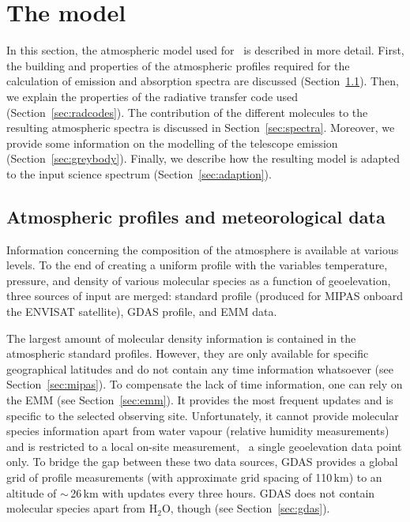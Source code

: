 \section{The model}\label{sec:model}
In this section, the atmospheric model used for \mf\ is described in
more detail. First, the building and properties of the atmospheric profiles
required for the calculation of emission and absorption spectra are discussed
(Section~\ref{sec:profiles}). Then, we explain the properties of the
radiative transfer code used (Section~\ref{sec:radcodes}). The contribution of
the different molecules to the resulting atmospheric spectra is discussed in
Section~\ref{sec:spectra}. Moreover, we provide some information on the
modelling of the telescope emission (Section~\ref{sec:greybody}). Finally, we
describe how the resulting model is adapted to the input science spectrum
(Section~\ref{sec:adaption}).

\subsection{Atmospheric profiles and meteorological data}\label{sec:profiles}
Information concerning the composition of the atmosphere is available at
various levels. To the end of creating a uniform profile with the variables
temperature, pressure, and density of various molecular species as a function
of geoelevation, three sources of input are merged: standard profile
(produced for \ac{MIPAS} onboard the ENVISAT satellite), \ac{GDAS} profile, and
\ac{EMM} data.

The largest amount of molecular density information is contained in the
atmospheric standard profiles. However, they are only available for specific
geographical latitudes and do not contain any time information whatsoever
(see Section~\ref{sec:mipas}). To compensate the lack of time information, one
can rely on the EMM (see Section~\ref{sec:emm}). It provides the most frequent
updates and is specific to the selected observing site. Unfortunately, it
cannot provide molecular species information apart from water vapour (relative
humidity measurements) and is restricted to a local on-site measurement, \ie\
a single geoelevation data point only. To bridge the gap between these two data
sources, \ac{GDAS} provides a global grid of profile measurements (with
approximate grid spacing of 110\,km) to an altitude of $\sim$\,26\,km with
updates every three hours. \ac{GDAS} does not contain molecular species apart
from H$_2$O, though (see Section~\ref{sec:gdas}).


